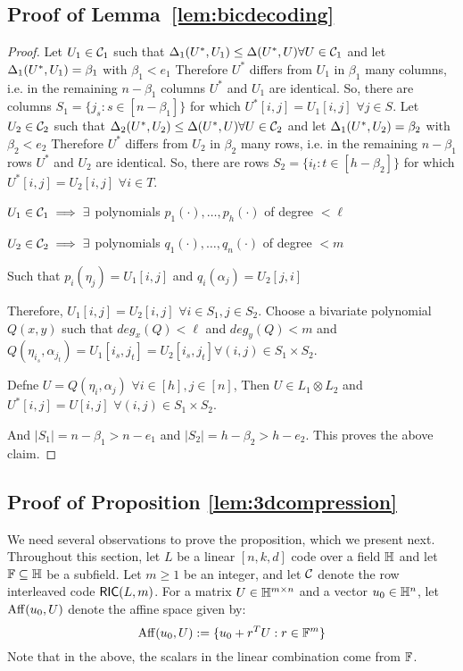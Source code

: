 \subsection{Proof of Lemma~\ref{lem:bicdecoding} }\label{prooflemmaRScode}
\begin{proof}
	Let $U_1 \in \mathcal{C}_1$  such that $\Delta_1(U^\ast, U_1) \leq \Delta(U^\ast, U) \forall U\in \mathcal{C}_1$ and let $\Delta_1(U^\ast, U_1) = \beta_1$ with $\beta_1<e_1$
	Therefore $U^\ast$ differs from $U_1$ in $\beta_1$ many columns, i.e. in the remaining $n-\beta_1$ columns $U^\ast$ and $U_1$ are identical.
	So, there are columns $S_1 = \{j_{s} : s\in [n - \beta_1] \}$ for which $U^\ast[i,j] = U_1[i,j]$ $\forall j\in S$.
	Let $U_2 \in \mathcal{C}_2$  such that $\Delta_2(U^\ast, U_2) \leq \Delta(U^\ast, U) \forall U\in \mathcal{C}_2$ and let $\Delta_1(U^\ast, U_2) = \beta_2$ with $\beta_2<e_2$
	Therefore $U^\ast$ differs from $U_2$ in $\beta_2$ many rows, i.e. in the remaining $n-\beta_1$ rows $U^\ast$ and $U_2$ are identical.
	So, there are rows $S_2 = \{i_{t} : t\in [h - \beta_2] \}$ for which $U^\ast[i,j] = U_2[i,j]$ $\forall i\in T$.
	
	$U_1\in \mathcal{C}_1 \implies \exists$ polynomials $p_1(\cdot), \ldots, p_h(\cdot)$ of degree $< \ell$
	
	$U_2\in \mathcal{C}_2 \implies \exists$ polynomials $q_1(\cdot), \ldots, q_n(\cdot)$ of degree $< m$
	
	Such that $p_i(\eta_j) = U_1[i,j] $ and $ q_i(\alpha_j) = U_2[j,i]$
	
	Therefore, $U_1[i,j] = U_2[i,j]$ $\forall i\in S_1, j\in S_2$. Choose a bivariate polynomial $Q(x,y)$ such that $deg_x(Q)<\ell $ and $deg_y(Q)<m$ and $Q(\eta_{i_s}, \alpha_{j_t}) = U_1[i_s,j_t] = U_2[i_s,j_t] \forall (i, j)\in S_1\times S_2$. 
	
	Defne $U = Q(\eta_i,\alpha_j)$ $\forall i\in[h], j\in[n]$, Then $U \in L_1\otimes L_2$ and $U^\ast[i,j] = U[i,j]$ $\forall (i,j) \in S_1 \times S_2$.
	
	And $|S_1|= n-\beta_1 > n-e_1$ and $|S_2|= h-\beta_2 > h-e_2$.
	This proves the above claim.	
\end{proof}

\subsection{Proof of Proposition \ref{lem:3dcompression}} \label{app:ProofofLem3dcompression}
We need several observations to prove the proposition, which we present next.
Throughout this section, let $L$ be a linear $[n,k,d]$ code over a field $\mathbb{H}$ and let $\mathbb{F}\subseteq \mathbb{H}$ be a subfield.  Let $m\geq 1$ be an integer, and let $\mathcal{C}$ denote the row interleaved code $\mathsf{RIC}(L,m)$. For a matrix $U\in \mathbb{H}^{m\times n}$ and a vector $u_0\in \mathbb{H}^n$, let ${\rm Aff}({u_0},{U})$ denote the affine space given by:
\begin{equation}\label{eq:affspace}
\aff{u_0}{U} := \{u_0+r^TU: r\in \FF^m\}
\end{equation}
Note that in the above, the scalars in the linear combination come from $\mathbb{F}$.

